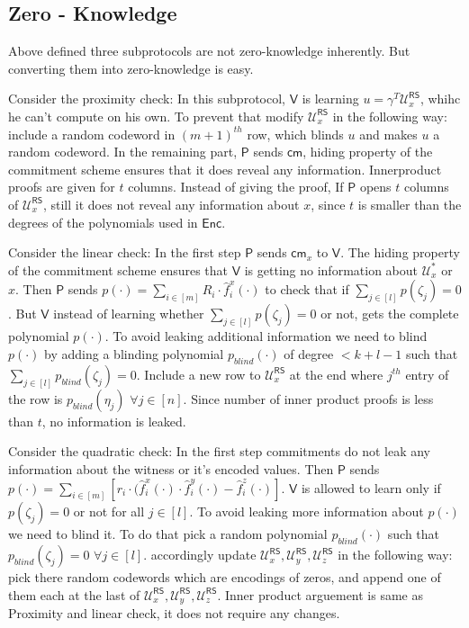 \documentclass[runningheads]{llncs}
\def\prover{\mathsf{P}}
\def\verifier{\mathsf{V}}
\def\RS{\mathsf{RS}} %
\def\cm{\mathsf{cm}} %
\def\oracle{\mathcal{U}^{\RS}}
\def\enc{\mathsf{Enc}}
\def\calU{\mathcal{U}}
\begin{document}
\subsection{Zero - Knowledge}
	Above defined three subprotocols are not zero-knowledge inherently. But converting them into zero-knowledge is easy. 
	
	Consider the proximity check: In this subprotocol, $\verifier$ is learning $u = \gamma^T\oracle_{x}$, whihc he can't compute on his own. To prevent that modify $\oracle_{x}$ in the following way: include a random codeword in $(m+1)^{th}$ row, which blinds $u$ and makes $u$ a random codeword. 
	In the remaining part, $\prover$ sends $\cm$, hiding property of the commitment scheme ensures that it does reveal any information.
	Innerproduct proofs are given for $t$ columns. Instead of giving the proof, If $\prover$ opens $t$ columns of $\oracle_{x}$, still it does not reveal any information about $x$, since $t$ is smaller than the degrees of the polynomials used in $\enc$.
	
	Consider the linear check: In the first step $\prover$ sends $\cm_x$ to $\verifier$. The hiding property of the commitment scheme ensures that $\verifier$ is getting no information about $\calU^*_x$ or $x$.
	Then $\prover$ sends $p(\cdot) = \sum_{i\in[m]} R_i \cdot \hat{f}^x_i(\cdot)$ to check that if $\sum_{j\in [l]} p(\zeta_j) = 0$. But $\verifier$ instead of learning whether $\sum_{j\in[l]} p(\zeta_j) = 0$ or not, gets the complete polynomial $p(\cdot)$. To avoid leaking additional information we need to blind $p(\cdot)$ by adding a blinding polynomial $p_{blind}(\cdot)$ of degree $< k + l - 1$ such that $\sum_{j\in[l]} p_{blind}(\zeta_j) = 0$. Include a new row to $\oracle_x$ at the end where $j^{th}$ entry of the row is $p_{blind}(\eta_j)$ $\forall j\in [n]$.
	Since number of inner product proofs is less than $t$, no information is leaked.
	
	Consider the quadratic check: In the first step commitments do not leak any information about the witness or it's encoded values.
	Then $\prover$ sends $p(\cdot) = \sum_{i\in[m]} [r_i\cdot (\hat{f}^x_i(\cdot)\cdot \hat{f}^y_i(\cdot) - \hat{f}^z_i(\cdot)]$. $\verifier$ is allowed to learn only if $p(\zeta_j)=0$ or not for all $j\in[l]$. To avoid leaking more information about $p(\cdot)$ we need to blind it. To do that pick a random polynomial $p_{blind}(\cdot)$ such that $p_{blind}(\zeta_j) = 0$ $\forall j\in [l]$. accordingly update $\oracle_x, \oracle_y,\oracle_z$ in the following way: pick there random codewords which are encodings of zeros, and append one of them each at the last of $\oracle_{x}, \oracle_{y}, \oracle_{z}$.
	Inner product arguement is same as Proximity and linear check, it does not require any changes. 
	
\end{document}
